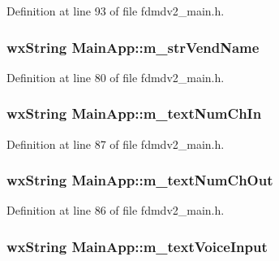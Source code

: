 Definition at line 93 of file fdmdv2\-\_\-main.\-h.

\hypertarget{class_main_app_a5a666c9feecd113dfd3b2f522b6d5fc9}{
\subsubsection[{m\-\_\-str\-Vend\-Name}]{\setlength{\rightskip}{0pt plus 5cm}wx\-String Main\-App\-::m\-\_\-str\-Vend\-Name}}\label{class_main_app_a5a666c9feecd113dfd3b2f522b6d5fc9}


Definition at line 80 of file fdmdv2\-\_\-main.\-h.

\hypertarget{class_main_app_a6f04f0f61a76df541a59101b627448da}{
\subsubsection[{m\-\_\-text\-Num\-Ch\-In}]{\setlength{\rightskip}{0pt plus 5cm}wx\-String Main\-App\-::m\-\_\-text\-Num\-Ch\-In}}\label{class_main_app_a6f04f0f61a76df541a59101b627448da}


Definition at line 87 of file fdmdv2\-\_\-main.\-h.

\hypertarget{class_main_app_aeac0e4eef0eb34a0cb974ac9208182aa}{
\subsubsection[{m\-\_\-text\-Num\-Ch\-Out}]{\setlength{\rightskip}{0pt plus 5cm}wx\-String Main\-App\-::m\-\_\-text\-Num\-Ch\-Out}}\label{class_main_app_aeac0e4eef0eb34a0cb974ac9208182aa}


Definition at line 86 of file fdmdv2\-\_\-main.\-h.

\hypertarget{class_main_app_a23f3ff36360c245d7f5f1fc3e9300c91}{
\subsubsection[{m\-\_\-text\-Voice\-Input}]{\setlength{\rightskip}{0pt plus 5cm}wx\-String Main\-App\-::m\-\_\-text\-Voice\-Input}}\label{class_main_app_a23f3ff36360c245d7f5f1fc3e9300c91}


